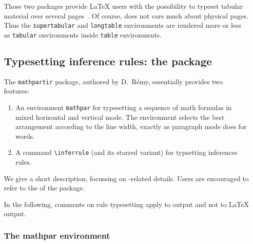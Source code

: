 Those two packages provide \LaTeX{} users with the
possibility to typeset tabular material over several
pages~\cite[Section~5.4]{latexbis}. Of course, \hevea{}
does not care much about physical pages.
Thus the \texttt{supertabular}
and \texttt{longtable} environments are rendered more or less
as \texttt{tabular} environments inside \texttt{table} environments.

\subsection{Typesetting inference rules: the
\label{mathpartir:package}  package}

The \texttt{mathpartir} package, authored by D.~R\'emy, essentially
provides two features:
\begin{enumerate}
\item
An environment \texttt{mathpar} for typesetting a sequence of math formulas in mixed horizontal and vertical mode. The environment selects the best arrangement according to the line width, exactly as paragraph mode does for words.
\item A command \verb+\inferrule+ (and its starred variant) for
typsetting inferences rules.
\end{enumerate}
We give a short description, focussing on \hevea{}-related details.
Users are encouraged to refer to the
 of the package.

In the following, comments on rule typesetting apply to \hevea{} output
and not to \LaTeX{} output.

\subsubsection {The mathpar environment}

